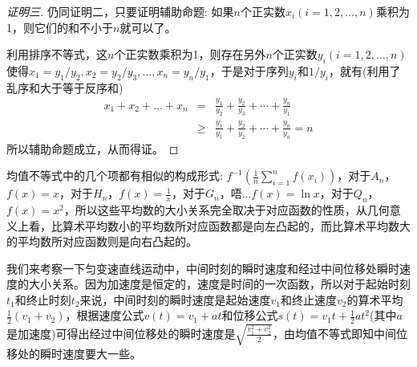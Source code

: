 \begin{proof}[证明三]
  仍同证明二，只要证明辅助命题: 如果$n$个正实数$x_i(i=1,2,\ldots,n)$乘积为1，则它们的和不小于$n$就可以了。

  利用排序不等式，这$n$个正实数乘积为1，则存在另外$n$个正实数$y_i(i=1,2,\dots,n)$使得$x_1=y_1/y_2,x_2=y_2/y_3,\dots,x_n=y_n/y_1$，于是对于序列$y_i$和$1/y_i$，就有(利用了乱序和大于等于反序和)
  \begin{eqnarray*}
    x_1+x_2+\dots+x_n & = & 
                            \frac{y_1}{y_2}+\frac{y_2}{y_3}+\cdots+\frac{y_n}{y_1} \\
    & \geqslant & \frac{y_1}{y_1}+\frac{y_2}{y_2}+\cdots+\frac{y_n}{y_n} = n
  \end{eqnarray*}
  所以辅助命题成立，从而得证。
\end{proof}

\begin{example}
  均值不等式中的几个项都有相似的构成形式: $f^{-1}\left( \frac{1}{n}\sum_{i=1}^nf(x_i) \right)$，对于$A_n$，$f(x)=x$，对于$H_n$，$f(x)=\frac{1}{x}$，对于$G_n$，唔...$f(x)=\ln{x}$，对于$Q_n$，$f(x)=x^2$，所以这些平均数的大小关系完全取决于对应函数的性质，从几何意义上看，比算术平均数小的平均数所对应函数都是向左凸起的，而比算术平均数大的平均数所对应函数则是向右凸起的。
\end{example}

\begin{example}[匀变速直线运动中间时刻瞬时速度和中间位移瞬时速度的大小]
  我们来考察一下匀变速直线运动中，中间时刻的瞬时速度和经过中间位移处瞬时速度的大小关系。因为加速度是恒定的，速度是时间的一次函数，所以对于起始时刻$t_1$和终止时刻$t_2$来说，中间时刻的瞬时速度是起始速度$v_1$和终止速度$v_2$的算术平均$\frac{1}{2}(v_1+v_2)$，根据速度公式$v(t)=v_1+at$和位移公式$s(t)=v_1t+\frac{1}{2}at^2$(其中$a$是加速度)可得出经过中间位移处的瞬时速度是$\sqrt{\frac{v_1^2+v_2^2}{2}}$，由均值不等式即知中间位移处的瞬时速度要大一些。
\end{example}

